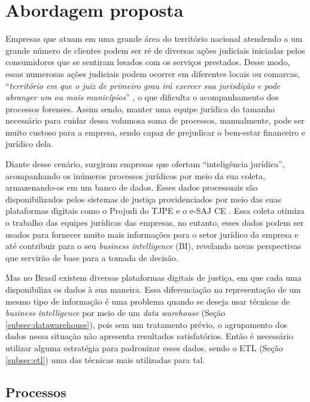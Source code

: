 \section{Abordagem proposta}
\label{sec:abordagem}

Empresas que atuam em uma grande área do território nacional atendendo a um grande número de clientes podem ser ré de diversas ações judiciais iniciadas pelos consumidores que se sentiram lesados com os serviços prestados. Desse modo, essas numerosas ações judiciais podem ocorrer em diferentes locais ou comarcas, \enquote{\textit{território em que o juiz de primeiro grau irá exercer sua jurisdição e pode abranger um ou mais municípios}} \cite{cnj:comarca}, o que dificulta o acompanhamento dos processos forenses. Assim sendo, manter uma equipe jurídica do tamanho necessário para cuidar dessa volumosa soma de processos, manualmente, pode ser muito custoso para a empresa, sendo capaz de prejudicar o bem-estar financeiro e jurídico dela.

Diante desse cenário, surgiram empresas que ofertam \enquote{inteligência jurídica}, acompanhando os inúmeros processos jurídicos por meio da sua coleta, armazenando-os em um banco de dados. Esses dados processuais são disponibilizados pelos sistemas de justiça providenciados por meio das suas plataformas digitais como o Projudi do TJPE \cite{tjpe} e o e-SAJ CE \cite{esajce}. Essa coleta otimiza o trabalho das equipes jurídicas das empresas, no entanto, esses dados podem ser usados para fornecer muito mais informações para o setor jurídico da empresa e até contribuir para o seu \textit{business intelligence} (BI), revelando novas perspectivas que servirão de base para a tomada de decisão.

Mas no Brasil existem diversas plataformas digitais de justiça, em que cada uma disponibiliza os dados à sua maneira. Essa diferenciação na representação de um mesmo tipo de informação é uma problema quando se deseja usar técnicas de \textit{business intelligence} por meio de um \textit{data warehouse} (Seção \ref{subsec:datawarehouse}), pois sem um tratamento prévio, o agrupamento dos dados nessa situação não apresenta resultados satisfatórios. Então é necessário utilizar alguma estratégia para padronizar esses dados, sendo o ETL (Seção \ref{subsec:etl}) uma das técnicas mais utilizadas para tal.


\subsection{Processos}
\label{subsec:processos}

